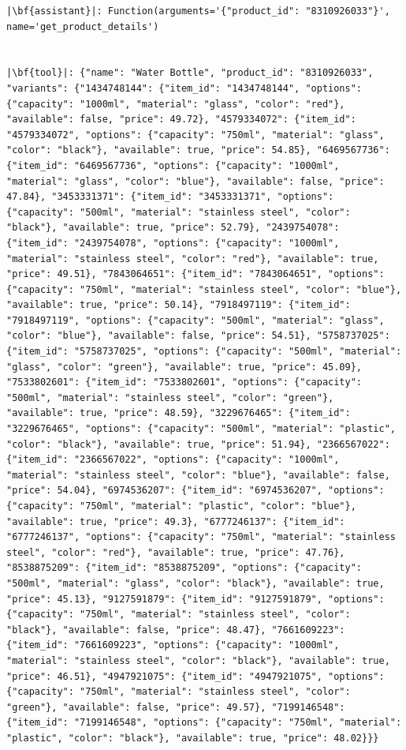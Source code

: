 \begin{longlisting}
\begin{verbatim}
|\bf{assistant}|: Function(arguments='{"product_id": "8310926033"}', name='get_product_details')


|\bf{tool}|: {"name": "Water Bottle", "product_id": "8310926033", "variants": {"1434748144": {"item_id": "1434748144", "options": {"capacity": "1000ml", "material": "glass", "color": "red"}, "available": false, "price": 49.72}, "4579334072": {"item_id": "4579334072", "options": {"capacity": "750ml", "material": "glass", "color": "black"}, "available": true, "price": 54.85}, "6469567736": {"item_id": "6469567736", "options": {"capacity": "1000ml", "material": "glass", "color": "blue"}, "available": false, "price": 47.84}, "3453331371": {"item_id": "3453331371", "options": {"capacity": "500ml", "material": "stainless steel", "color": "black"}, "available": true, "price": 52.79}, "2439754078": {"item_id": "2439754078", "options": {"capacity": "1000ml", "material": "stainless steel", "color": "red"}, "available": true, "price": 49.51}, "7843064651": {"item_id": "7843064651", "options": {"capacity": "750ml", "material": "stainless steel", "color": "blue"}, "available": true, "price": 50.14}, "7918497119": {"item_id": "7918497119", "options": {"capacity": "500ml", "material": "glass", "color": "blue"}, "available": false, "price": 54.51}, "5758737025": {"item_id": "5758737025", "options": {"capacity": "500ml", "material": "glass", "color": "green"}, "available": true, "price": 45.09}, "7533802601": {"item_id": "7533802601", "options": {"capacity": "500ml", "material": "stainless steel", "color": "green"}, "available": true, "price": 48.59}, "3229676465": {"item_id": "3229676465", "options": {"capacity": "500ml", "material": "plastic", "color": "black"}, "available": true, "price": 51.94}, "2366567022": {"item_id": "2366567022", "options": {"capacity": "1000ml", "material": "stainless steel", "color": "blue"}, "available": false, "price": 54.04}, "6974536207": {"item_id": "6974536207", "options": {"capacity": "750ml", "material": "plastic", "color": "blue"}, "available": true, "price": 49.3}, "6777246137": {"item_id": "6777246137", "options": {"capacity": "750ml", "material": "stainless steel", "color": "red"}, "available": true, "price": 47.76}, "8538875209": {"item_id": "8538875209", "options": {"capacity": "500ml", "material": "glass", "color": "black"}, "available": true, "price": 45.13}, "9127591879": {"item_id": "9127591879", "options": {"capacity": "750ml", "material": "stainless steel", "color": "black"}, "available": false, "price": 48.47}, "7661609223": {"item_id": "7661609223", "options": {"capacity": "1000ml", "material": "stainless steel", "color": "black"}, "available": true, "price": 46.51}, "4947921075": {"item_id": "4947921075", "options": {"capacity": "750ml", "material": "stainless steel", "color": "green"}, "available": false, "price": 49.57}, "7199146548": {"item_id": "7199146548", "options": {"capacity": "750ml", "material": "plastic", "color": "black"}, "available": true, "price": 48.02}}}



\end{verbatim}
\end{longlisting}
